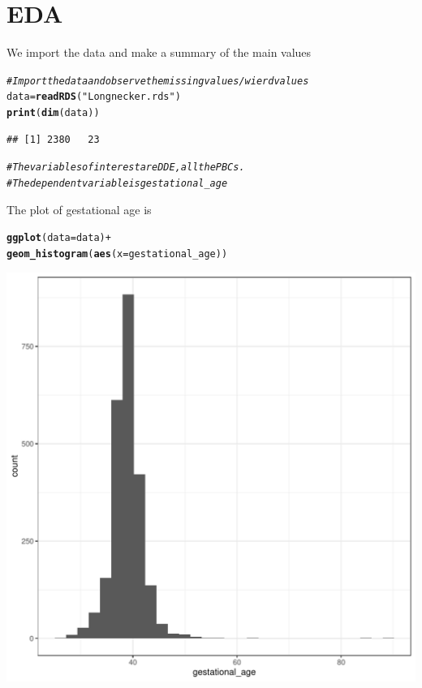 \documentclass{article}\usepackage[]{graphicx}\usepackage[]{color}
\makeatletter
\def\maxwidth{ %
  \ifdim\Gin@nat@width>\linewidth
    \linewidth
  \else
    \Gin@nat@width
  \fi
}
\newcommand{\hlstr}[1]{\textcolor[rgb]{0.192,0.494,0.8}{#1}}%
\newcommand{\hlcom}[1]{\textcolor[rgb]{0.678,0.584,0.686}{\textit{#1}}}%
\newcommand{\hlopt}[1]{\textcolor[rgb]{0,0,0}{#1}}%
\newcommand{\hlstd}[1]{\textcolor[rgb]{0.345,0.345,0.345}{#1}}%
\newcommand{\hlkwb}[1]{\textcolor[rgb]{0.69,0.353,0.396}{#1}}%
\newcommand{\hlkwc}[1]{\textcolor[rgb]{0.333,0.667,0.333}{#1}}%
\newcommand{\hlkwd}[1]{\textcolor[rgb]{0.737,0.353,0.396}{\textbf{#1}}}%
\newenvironment{kframe}{%
 \def\at@end@of@kframe{}%
 \ifinner\ifhmode%
  \def\at@end@of@kframe{\end{minipage}}%
  \begin{minipage}{\columnwidth}%
 \fi\fi%
 \def\FrameCommand##1{\hskip\@totalleftmargin \hskip-\fboxsep
 \colorbox{shadecolor}{##1}\hskip-\fboxsep
     \hskip-\linewidth \hskip-\@totalleftmargin \hskip\columnwidth}%
 \MakeFramed {\advance\hsize-\width
   \@totalleftmargin\z@ \linewidth\hsize
   \@setminipage}}%
 {\par\unskip\endMakeFramed%
 \at@end@of@kframe}
\newenvironment{knitrout}{}{} %
\makeatother
\begin{document}
\section{EDA}
We import the data and make a summary of the main values
\begin{knitrout}
\color{fgcolor}\begin{kframe}
\begin{alltt}
\hlcom{# Import the data and observe the missing values / wierd values}
\hlstd{data} \hlkwb{=} \hlkwd{readRDS}\hlstd{(}\hlstr{"Longnecker.rds"}\hlstd{)}
\hlkwd{print}\hlstd{(}\hlkwd{dim}\hlstd{(data))}
\end{alltt}
\begin{verbatim}
## [1] 2380   23
\end{verbatim}
\begin{alltt}
\hlcom{# The variables of interest are DDE, all the PBCs. }
\hlcom{# The dependent variable is gestational_age}
\end{alltt}
\end{kframe}
\end{knitrout}
The plot of gestational age is 
\begin{knitrout}
\color{fgcolor}\begin{kframe}
\begin{alltt}
\hlkwd{ggplot}\hlstd{(}\hlkwc{data} \hlstd{= data)} \hlopt{+}
  \hlkwd{geom_histogram}\hlstd{(}\hlkwd{aes}\hlstd{(}\hlkwc{x}\hlstd{=gestational_age))}
\end{alltt}


{\ttfamily\noindent\itshape\color{messagecolor}{\#\# `stat\_bin()` using `bins = 30`. Pick better value with `binwidth`.}}\end{kframe}
\includegraphics[width=\maxwidth]{figure/unnamed-chunk-3-1} 

\end{knitrout}
\end{document}
